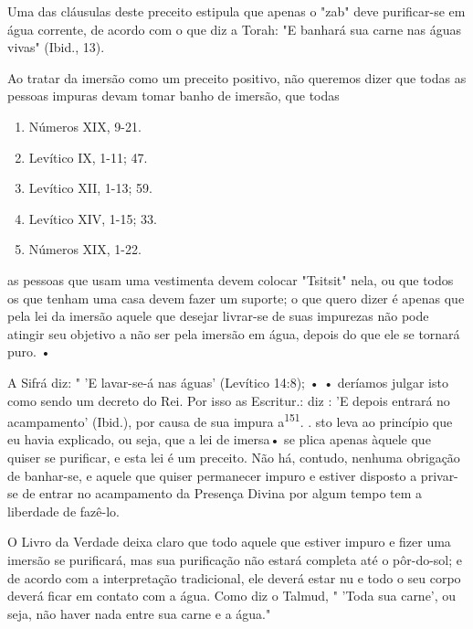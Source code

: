 \begin{itemize}
\begin{enumrate}
\begin{itemize}
\begin{itemize}
Uma das cláusulas deste preceito estipula que apenas o "zab" deve
purificar-se em água corrente, de acordo com o que diz a Torah: "E
banhará sua carne nas águas vivas" (Ibid., 13).

Ao tratar da imersão como um preceito positivo, não queremos di­zer que
todas as pessoas impuras devam tomar banho de imersão, que todas


\begin{enumerate}
\def\labelenumi{\arabic{enumi}.}
\setcounter{enumi}{145}
\item
 
 Números XIX, 9-21.
 
\item
 
 Levítico IX, 1-11; 47.
 
\item
 
 Levítico XII, 1-13; 59.
 
\item
 
 Levítico XIV, 1-15; 33.
 
\item
 
 Números XIX, 1-22.
 
\end{enumerate}




as pessoas que usam uma vestimenta devem colocar "Tsitsit" nela, ou que
to­dos os que tenham uma casa devem fazer um suporte; o que quero dizer
é ape­nas que pela lei da imersão aquele que desejar livrar-se de suas
impurezas não pode atingir seu objetivo a não ser pela imersão em água,
depois do que ele se tornará puro. •

A Sifrá diz: " 'E lavar-se-á nas águas' (Levítico 14:8); • • deríamos
jul­gar isto como sendo um decreto do Rei. Por isso as Escritur.: diz :
'E depois entrará no acampamento' (Ibid.), por causa de sua impura
a\textsuperscript{151}. . sto leva ao princípio que eu
havia explicado, ou seja, que a lei de imersa• se plica apenas àquele
que quiser se purificar, e esta lei é um preceito. Não há, contudo,
ne­nhuma obrigação de banhar-se, e aquele que quiser permanecer impuro e
esti­ver disposto a privar-se de entrar no acampamento da Presença
Divina por al­gum tempo tem a liberdade de fazê-lo.

O Livro da Verdade deixa claro que todo aquele que estiver impuro e
fizer uma imersão se purificará, mas sua purificação não estará completa
até o pôr-do-sol; e de acordo com a interpretação tradicional, ele
deverá estar nu e todo o seu corpo deverá ficar em contato com a água.
Como diz o Talmud, " 'Toda sua carne', ou seja, não haver nada entre sua
carne e a água."


\end{itemize}
\end{itemize}
\end{enumrate}
\end{itemize}
